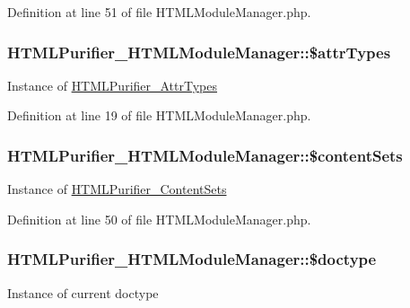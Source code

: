 Definition at line 51 of file H\+T\+M\+L\+Module\+Manager.\+php.

\hypertarget{classHTMLPurifier__HTMLModuleManager_ae71132f5eb2e1999b9c2e9d19a00da77}{
\subsubsection[{\$attr\+Types}]{\setlength{\rightskip}{0pt plus 5cm}H\+T\+M\+L\+Purifier\+\_\+\+H\+T\+M\+L\+Module\+Manager\+::\$attr\+Types}}\label{classHTMLPurifier__HTMLModuleManager_ae71132f5eb2e1999b9c2e9d19a00da77}
Instance of \hyperlink{classHTMLPurifier__AttrTypes}{H\+T\+M\+L\+Purifier\+\_\+\+Attr\+Types} 

Definition at line 19 of file H\+T\+M\+L\+Module\+Manager.\+php.

\hypertarget{classHTMLPurifier__HTMLModuleManager_aa756a5b18c58d609963a2302e5c569a1}{
\subsubsection[{\$content\+Sets}]{\setlength{\rightskip}{0pt plus 5cm}H\+T\+M\+L\+Purifier\+\_\+\+H\+T\+M\+L\+Module\+Manager\+::\$content\+Sets}}\label{classHTMLPurifier__HTMLModuleManager_aa756a5b18c58d609963a2302e5c569a1}
Instance of \hyperlink{classHTMLPurifier__ContentSets}{H\+T\+M\+L\+Purifier\+\_\+\+Content\+Sets} 

Definition at line 50 of file H\+T\+M\+L\+Module\+Manager.\+php.

\hypertarget{classHTMLPurifier__HTMLModuleManager_aaeffccf938152286738d5c3466eae2b5}{
\subsubsection[{\$doctype}]{\setlength{\rightskip}{0pt plus 5cm}H\+T\+M\+L\+Purifier\+\_\+\+H\+T\+M\+L\+Module\+Manager\+::\$doctype}}\label{classHTMLPurifier__HTMLModuleManager_aaeffccf938152286738d5c3466eae2b5}
Instance of current doctype 

